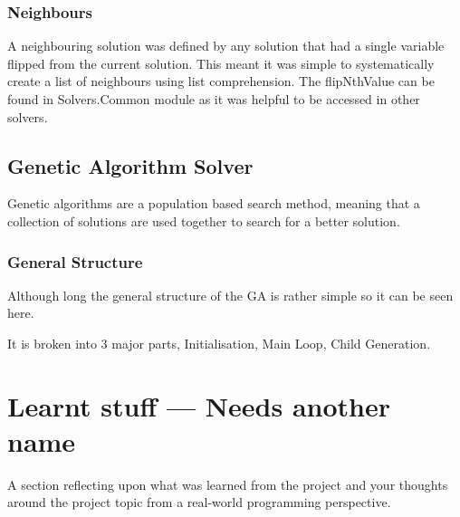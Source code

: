 \documentclass[a4paper]{article}
\begin{document}
\subsubsection{Neighbours}
A neighbouring solution was defined by any solution that had a single variable flipped from the current solution.
This meant it was simple to systematically create a list of neighbours using list comprehension.
The flipNthValue can be found in Solvers.Common module as it was helpful to be accessed in other solvers.


\subsection{Genetic Algorithm Solver}
Genetic algorithms are a population based search method, meaning that a collection of solutions are used together to search for a better solution.

\subsubsection{General Structure}
Although long the general structure of the GA is rather simple so it can be seen here.

It is broken into 3 major parts, Initialisation, Main Loop, Child Generation.


\section{Learnt stuff --- Needs another name}
A section reflecting upon what was learned from the project and your
thoughts around the project topic from a real-world programming perspective.

\end{document}
